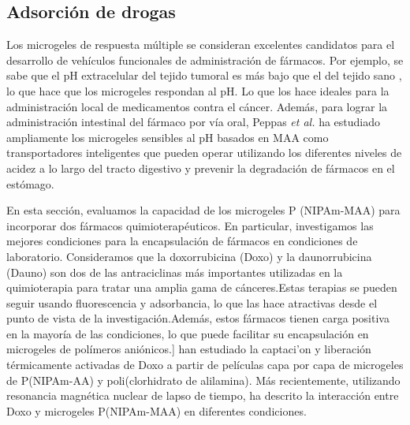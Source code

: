 \subsection{Adsorci\'on de drogas}

Los microgeles de respuesta m\'ultiple se consideran excelentes candidatos para el desarrollo de veh\'iculos funcionales de administraci\'on de f\'armacos.
Por ejemplo, se sabe que el pH extracelular del tejido tumoral es m\'as bajo que el del tejido sano \addcite[Gerweck1996], lo que hace que los microgeles respondan al pH.
Lo que los hace ideales para la administraci\'on local de medicamentos contra el c\'ancer\addcite[Dadsetan2013].
Adem\'as, para lograr la administraci\'on intestinal del f\'armaco por v\'ia oral,
Peppas \emph{et al.} ha estudiado ampliamente los microgeles sensibles al pH basados en MAA como transportadores inteligentes que pueden operar utilizando los diferentes niveles de acidez a lo largo del tracto digestivo y prevenir la degradación de f\'armacos en el est\'omago.


En esta secci\'on, evaluamos la capacidad de los microgeles P (NIPAm-MAA) para incorporar dos f\'armacos quimioterap\'euticos.
En particular, investigamos las mejores condiciones para la encapsulaci\'on de f\'armacos en condiciones de laboratorio.
Consideramos que la doxorrubicina (Doxo) y la daunorrubicina (Dauno) son dos de las antraciclinas más importantes utilizadas en la quimioterapia para tratar una amplia gama de c\'anceres.
Estas terapias se pueden seguir usando fluorescencia y adsorbancia, lo que las hace atractivas desde el punto de vista de la investigaci\'on.
Adem\'as, estos f\'armacos tienen carga positiva en la mayor\'ia de las condiciones, lo que puede facilitar su encapsulaci\'on en microgeles de pol\'imeros ani\'onicos.\addcite[Li2019]]
 han estudiado la captaci'on y liberaci\'on t\'ermicamente activadas de Doxo a partir de pel\'iculas capa por capa de microgeles de P(NIPAm-AA) y poli(clorhidrato de alilamina).
M\'as recientemente, utilizando resonancia magnética nuclear de lapso de tiempo,  ha descrito la interacci\'on entre Doxo y microgeles P(NIPAm-MAA) en diferentes condiciones.



